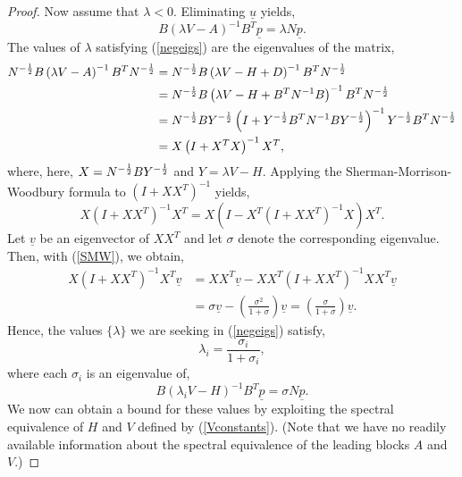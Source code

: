 \documentclass{imamci}
\numberwithin{equation}{section}
\begin{document}
\begin{proof}
Now assume that $\lambda <0$. Eliminating $\underline{u}$ yields,
\begin{equation}
\label{negeigs} B\left(\lambda V-A\right)^{-1}B^{T}
\underline{p} = \lambda N \underline{p}.
\end{equation}
The values of $\lambda$ satisfying (\ref{negeigs})
are the eigenvalues of the matrix,
\begin{align*}
\mathnormal{N}^{-\frac{1}{2}}\mathnormal{B}\left(\lambda
V - A \right)^{-1}\mathnormal{B}^{T}\mathnormal{N}^{-\frac{1}{2}}
& = \mathnormal{N}^{-\frac{1}{2}}\mathnormal{B}\left(\lambda V -
H
+ D\right)^{-1}\mathnormal{B}^{T}\mathnormal{N}^{-\frac{1}{2}} \\
 & =\mathnormal{N}^{-\frac{1}{2}}\mathnormal{B}\left(\lambda V - H
+ B^{T}N^{-1}B\right)^{-1}\mathnormal{B}^{T}\mathnormal{N}^{-\frac{1}{2}}\\
 &= \mathnormal{N}^{-\frac{1}{2}}\mathnormal{B}Y^{-\frac{1}{2}}\left(I
+ Y^{-\frac{1}{2}} B^{T}N^{-1}B Y^{-\frac{1}{2}}\right)^{-1} Y^{-\frac{1}{2}}
 \mathnormal{B}^{T}\mathnormal{N}^{-\frac{1}{2}} \\
 & =\mathnormal{X}\left(\mathnormal{I} + \mathnormal{X}^{T}\mathnormal{X}
 \right)^{-1}\mathnormal{X}^{T},
\end{align*}
where, here, $\mathnormal{X} = \mathnormal{N}^{-\frac{1}{2}}\mathnormal{B}
\mathnormal{Y}^{-\frac{1}{2}}$ and $Y=\lambda V - H$. Applying the 
Sherman-Morrison-Woodbury formula to $\left(I + XX^{T} \right)^{-1}$ yields,
\begin{equation}
\label{SMW}
X\left(I + XX^{T} \right)^{-1}X^{T}= X\left(I-X^{T}\left(I + XX^{T} \right)^{-1}
X\right)X^{T}.
\end{equation}
Let $\underline{v}$ be an eigenvector of $XX^{T}$ and let $\sigma$ denote
the corresponding eigenvalue. Then, with (\ref{SMW}), we obtain,
\begin{align*}
 X\left(I + XX^{T} \right)^{-1}X^{T}\underline{v} & =   XX^{T}\underline{v}
 - XX^{T}\left(I + XX^{T} \right)^{-1}XX^{T}\underline{v} \\
 & =  \sigma \underline{v} - \left(\frac{\sigma^{2}}{1+\sigma}\right) \underline{v}
 =  \left( \frac{\sigma}{1 + \sigma}\right) \underline{v}.
\end{align*}
Hence, the values $\{\lambda\}$ we are seeking in (\ref{negeigs}) satisfy,
\begin{equation}\label{sl} 
\lambda_{i} = \frac{\sigma_{i}}{1 +\sigma_{i}}, 
\end{equation} 
where each $\sigma_{i}$ is an eigenvalue of,
\begin{equation}
\label{needthis} B\left(\lambda_{i}V - H
\right)^{-1}B^{T}\underline{p} = \sigma N \underline{p}.
\end{equation}
We now can obtain a bound for these values by exploiting the spectral equivalence
of $H$ and $V$ defined by (\ref{Vconstants}). (Note that we have no readily
available information about the spectral equivalence of the leading blocks
$A$ and $V$.)
\end{proof}
\end{document}
